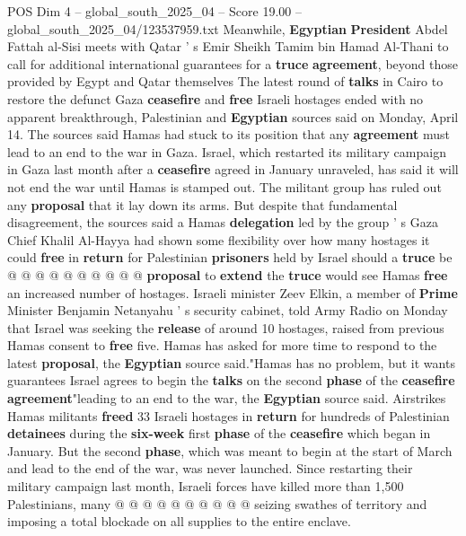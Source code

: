 \begin{textsample}{POS Dim 4 – global\_south\_2025\_04 – Score 19.00 – global\_south\_2025\_04/123537959.txt}  \label{ex:f4_pos_229}
Meanwhile, \textbf{Egyptian} \textbf{President} Abdel Fattah al-Sisi meets with Qatar ' s Emir Sheikh Tamim bin Hamad Al-Thani to call for additional international guarantees for a \textbf{truce} \textbf{agreement}, beyond those provided by Egypt and Qatar themselves The latest round of \textbf{talks} in Cairo to restore the defunct Gaza \textbf{ceasefire} and \textbf{free} Israeli hostages ended with no apparent breakthrough, Palestinian and \textbf{Egyptian} sources said on Monday, April 14.
The sources said Hamas had stuck to its position that any \textbf{agreement} must lead to an end to the war in Gaza.
Israel, which restarted its military campaign in Gaza last month after a \textbf{ceasefire} agreed in January unraveled, has said it will not end the war until Hamas is stamped out.
The militant group has ruled out any \textbf{proposal} that it lay down its arms.
But despite that fundamental disagreement, the sources said a Hamas \textbf{delegation} led by the group ' s Gaza Chief Khalil Al-Hayya had shown some flexibility over how many hostages it could \textbf{free} in \textbf{return} for Palestinian \textbf{prisoners} held by Israel should a \textbf{truce} be @ @ @ @ @ @ @ @ @ @ \textbf{proposal} to \textbf{extend} the \textbf{truce} would see Hamas \textbf{free} an increased number of hostages.
Israeli minister Zeev Elkin, a member of \textbf{Prime} Minister Benjamin Netanyahu ' s security cabinet, told Army Radio on Monday that Israel was seeking the \textbf{release} of around 10 hostages, raised from previous Hamas consent to \textbf{free} five.
Hamas has asked for more time to respond to the latest \textbf{proposal}, the \textbf{Egyptian} source said."Hamas has no problem, but it wants guarantees Israel agrees to begin the \textbf{talks} on the second \textbf{phase} of the \textbf{ceasefire} \textbf{agreement}"leading to an end to the war, the \textbf{Egyptian} source said.
Airstrikes Hamas militants \textbf{freed} 33 Israeli hostages in \textbf{return} for hundreds of Palestinian \textbf{detainees} during the \textbf{six-week} first \textbf{phase} of the \textbf{ceasefire} which began in January.
But the second \textbf{phase}, which was meant to begin at the start of March and lead to the end of the war, was never launched.
Since restarting their military campaign last month, Israeli forces have killed more than 1,500 Palestinians, many @ @ @ @ @ @ @ @ @ @ seizing swathes of territory and imposing a total blockade on all supplies to the entire enclave.

\end{textsample}

